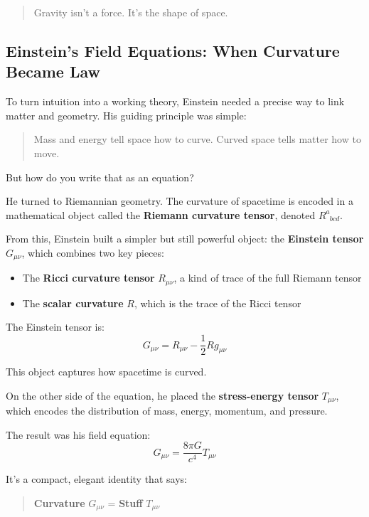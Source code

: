 \begin{quote}
Gravity isn’t a force. It’s the shape of space.
\end{quote}


\subsection{Einstein's Field Equations: When Curvature Became Law}

To turn intuition into a working theory, Einstein needed a precise way to link matter and geometry. His guiding principle was simple:

\begin{quote}
Mass and energy tell space how to curve. Curved space tells matter how to move.
\end{quote}

But how do you write that as an equation?

He turned to Riemannian geometry. The curvature of spacetime is encoded in a mathematical object called the \textbf{Riemann curvature tensor}, denoted \( R^a_{\phantom{a}bcd} \).

From this, Einstein built a simpler but still powerful object: the \textbf{Einstein tensor} \( G_{\mu\nu} \), which combines two key pieces:

\begin{itemize}
  \item The \textbf{Ricci curvature tensor} \( R_{\mu\nu} \), a kind of trace of the full Riemann tensor
  \item The \textbf{scalar curvature} \( R \), which is the trace of the Ricci tensor
\end{itemize}

The Einstein tensor is:
\[
G_{\mu\nu} = R_{\mu\nu} - \frac{1}{2} R g_{\mu\nu}
\]

This object captures how spacetime is curved.

On the other side of the equation, he placed the \textbf{stress-energy tensor} \( T_{\mu\nu} \), which encodes the distribution of mass, energy, momentum, and pressure.

The result was his field equation:
\[
G_{\mu\nu} = \frac{8\pi G}{c^4} T_{\mu\nu}
\]

It’s a compact, elegant identity that says:

\begin{quote}
\textbf{Curvature} \( G_{\mu\nu} \) = \textbf{Stuff} \( T_{\mu\nu} \)
\end{quote}

